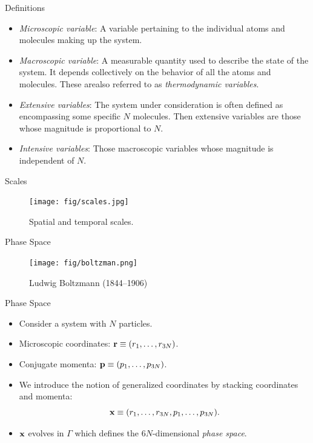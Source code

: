 \documentclass[10pt]{beamer}
\begin{document}
\begin{frame}{Definitions}
\begin{itemize}
\setlength\itemsep{1em}
  \item \textit{Microscopic variable}: A variable pertaining to the individual atoms and molecules making up the system.

  \item \textit{Macroscopic variable}: A measurable quantity used to describe the state of the system. It depends collectively on the behavior of all the atoms and molecules. These arealso referred to as \textit{thermodynamic variables}.

  \item \textit{Extensive variables}: The system under consideration is often defined as encompassing some specific $N$ molecules. Then extensive variables are those whose magnitude is proportional to $N$.

  \item \textit{Intensive variables}: Those macroscopic variables whose magnitude is independent of $N$.
\end{itemize}
\end{frame}

\begin{frame}{Scales}
\begin{figure}
  \texttt{[image: fig/scales.jpg]}
  \caption{Spatial and temporal scales.}
\end{figure}
\end{frame}

\begin{frame}{Phase Space}
\begin{figure}
  \texttt{[image: fig/boltzman.png]}
  \caption{Ludwig Boltzmann (1844--1906)}
\end{figure}
\end{frame}

\begin{frame}{Phase Space}
\begin{itemize}
\setlength\itemsep{1em}
  \item Consider a system with $N$ particles.
  \item Microscopic coordinates: ${\bf r} \equiv (r_1, \dots, r_{3N})$.
  \item Conjugate momenta: ${\bf p} \equiv (p_1, \dots, p_{3N})$.
  \item We introduce the notion of generalized coordinates by stacking coordinates and momenta:
  \begin{equation}
    {\bf x} \equiv (r_1, \dots, r_{3N}, p_1, \dots, p_{3N}).
  \end{equation}
  \item ${\bf x}$ evolves in $\Gamma$ which defines the $6N$-dimensional \textit{phase space}.
\end{itemize}
\end{frame}
\end{document}
